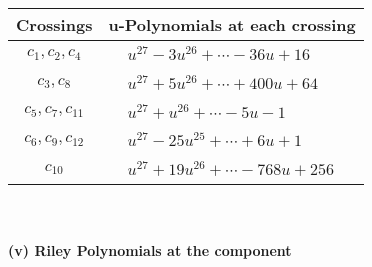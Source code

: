 \documentclass[1p]{elsarticle_modified}
\theoremstyle{definition}
\begin{document}
\begin{tabular}{m{50pt}|m{274pt}}
Crossings & \hspace{64pt}u-Polynomials at each crossing \\
\hline $$\begin{aligned}c_{1},c_{2},c_{4}\end{aligned}$$&$\begin{aligned}
&u^{27}-3 u^{26}+\cdots-36 u+16
\end{aligned}$\\
\hline $$\begin{aligned}c_{3},c_{8}\end{aligned}$$&$\begin{aligned}
&u^{27}+5 u^{26}+\cdots+400 u+64
\end{aligned}$\\
\hline $$\begin{aligned}c_{5},c_{7},c_{11}\end{aligned}$$&$\begin{aligned}
&u^{27}+u^{26}+\cdots-5 u-1
\end{aligned}$\\
\hline $$\begin{aligned}c_{6},c_{9},c_{12}\end{aligned}$$&$\begin{aligned}
&u^{27}-25 u^{25}+\cdots+6 u+1
\end{aligned}$\\
\hline $$\begin{aligned}c_{10}\end{aligned}$$&$\begin{aligned}
&u^{27}+19 u^{26}+\cdots-768 u+256
\end{aligned}$\\
\hline
\end{tabular}\\~\\
\newpage\renewcommand{\arraystretch}{1}
\flushleft \textbf{(v) Riley Polynomials at the component}\newline \\
\end{document}
